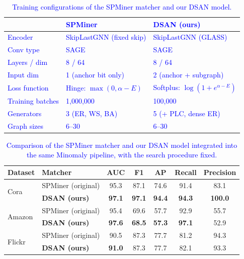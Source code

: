\documentclass[preprint,12pt]{elsarticle}
\newcommand{\new}[1]{\textcolor{blue}{#1}}
\theoremstyle{plain}
\theoremstyle{definition}
\theoremstyle{remark}
\begin{document}
\begin{table}[htbp]
    \footnotesize
    \centering
    \caption{\new{Training configurations of the SPMiner matcher and our DSAN model.}}
    \label{tab:model_comparison}
    \new{\begin{tabular}{|l|l|l|}
    \hline
    & \textbf{SPMiner} & \textbf{DSAN (ours)} \\ \hline
    Encoder & SkipLastGNN (fixed skip) & SkipLastGNN (GLASS) \\ \hline
    Conv type & SAGE & SAGE \\ \hline
    Layers / dim & 8 / 64 & 8 / 64 \\ \hline
    Input dim & 1 (anchor bit only) & 2 (anchor + subgraph) \\ \hline
    Loss function & Hinge: $\max(0, \alpha - E)$ & Softplus: $\log(1+e^{\alpha - E})$ \\ \hline
    Training batches & 1{,}000{,}000 & 100{,}000 \\ \hline
    Generators & 3 (ER, WS, BA) & 5 (+ PLC, dense ER) \\ \hline
    Graph sizes & 6--30 & 6--30 \\ \hline
    \end{tabular}}
\end{table}

\begin{table}[htbp]
    \footnotesize
    \centering
    \caption{\new{Comparison of the SPMiner matcher and our DSAN model integrated into the same Minomaly pipeline, with the search procedure fixed.}}
    \label{tab:dsan_vs_spminer}
    \begin{tabular}{|l|l|c|c|c|c|c|}
    \hline
    Dataset & Matcher & AUC & F1 & AP & Recall & Precision \\ \hline
    \multirow{2}{*}{Cora} & SPMiner (original) & 95.3 & 87.1 & 74.6 & 91.4 & 83.1 \\
     & \textbf{DSAN (ours)} & \textbf{97.1} & \textbf{97.1} & \textbf{94.4} & \textbf{94.3} & \textbf{100.0} \\ \hline
    \multirow{2}{*}{Amazon} & SPMiner (original) & 95.4 & 69.6 & 57.7 & 92.9 & 55.7 \\
     & \textbf{DSAN (ours)} & \textbf{97.6} & \textbf{68.5} & \textbf{57.3} & \textbf{97.1} & 52.9 \\ \hline
    \multirow{2}{*}{Flickr} & SPMiner (original) & 90.5 & 87.3 & 77.7 & 81.2 & 94.3 \\
     & \textbf{DSAN (ours)} & \textbf{91.0} & 87.3 & 77.7 & 82.1 & 93.3 \\ \hline
    \end{tabular}
\end{table}
\end{document}
